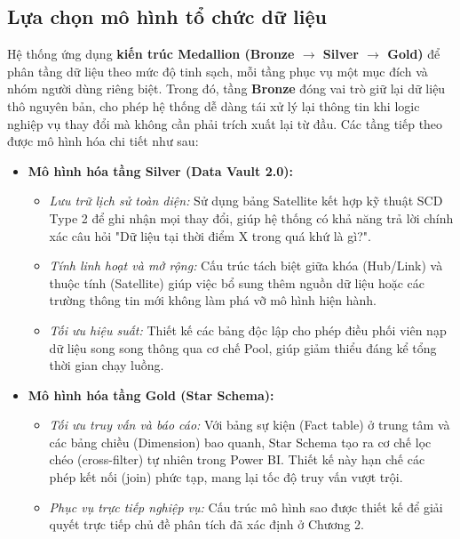 \subsection{Lựa chọn mô hình tổ chức dữ liệu}

Hệ thống ứng dụng \textbf{kiến trúc Medallion (Bronze $\rightarrow$ Silver $\rightarrow$ Gold)} để phân tầng dữ liệu theo mức độ tinh sạch, mỗi tầng phục vụ một mục đích và nhóm người dùng riêng biệt. Trong đó, tầng \textbf{Bronze} đóng vai trò giữ lại dữ liệu thô nguyên bản, cho phép hệ thống dễ dàng tái xử lý lại thông tin khi logic nghiệp vụ thay đổi mà không cần phải trích xuất lại từ đầu. Các tầng tiếp theo được mô hình hóa chi tiết như sau:

\begin{itemize}
    \item \textbf{Mô hình hóa tầng Silver (Data Vault 2.0):}
    \begin{itemize}
        \item \textit{Lưu trữ lịch sử toàn diện:} Sử dụng bảng Satellite kết hợp kỹ thuật SCD Type 2 để ghi nhận mọi thay đổi, giúp hệ thống có khả năng trả lời chính xác câu hỏi "Dữ liệu tại thời điểm X trong quá khứ là gì?".
        \item \textit{Tính linh hoạt và mở rộng:} Cấu trúc tách biệt giữa khóa (Hub/Link) và thuộc tính (Satellite) giúp việc bổ sung thêm nguồn dữ liệu hoặc các trường thông tin mới không làm phá vỡ mô hình hiện hành.
        \item \textit{Tối ưu hiệu suất:} Thiết kế các bảng độc lập cho phép điều phối viên nạp dữ liệu song song thông qua cơ chế Pool, giúp giảm thiểu đáng kể tổng thời gian chạy luồng.
    \end{itemize}

    \item \textbf{Mô hình hóa tầng Gold (Star Schema):}
    \begin{itemize}
        \item \textit{Tối ưu truy vấn và báo cáo:} Với bảng sự kiện (Fact table) ở trung tâm và các bảng chiều (Dimension) bao quanh, Star Schema tạo ra cơ chế lọc chéo (cross-filter) tự nhiên trong Power BI. Thiết kế này hạn chế các phép kết nối (join) phức tạp, mang lại tốc độ truy vấn vượt trội.
        \item \textit{Phục vụ trực tiếp nghiệp vụ:} Cấu trúc mô hình sao được thiết kế để giải quyết trực tiếp chủ đề phân tích đã xác định ở Chương 2.
    \end{itemize}
\end{itemize}




